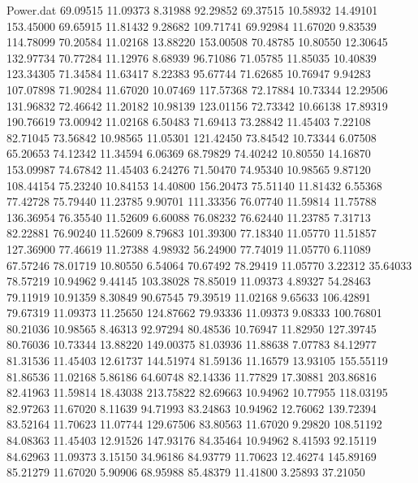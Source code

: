 \begin{filecontents}{Power.dat}
  69.09515   11.09373    8.31988   92.29852
  69.37515   10.58932   14.49101  153.45000
  69.65915   11.81432    9.28682  109.71741
  69.92984   11.67020    9.83539  114.78099
  70.20584   11.02168   13.88220  153.00508
  70.48785   10.80550   12.30645  132.97734
  70.77284   11.12976    8.68939   96.71086
  71.05785   11.85035   10.40839  123.34305
  71.34584   11.63417    8.22383   95.67744
  71.62685   10.76947    9.94283  107.07898
  71.90284   11.67020   10.07469  117.57368
  72.17884   10.73344   12.29506  131.96832
  72.46642   11.20182   10.98139  123.01156
  72.73342   10.66138   17.89319  190.76619
  73.00942   11.02168    6.50483   71.69413
  73.28842   11.45403    7.22108   82.71045
  73.56842   10.98565   11.05301  121.42450
  73.84542   10.73344    6.07508   65.20653
  74.12342   11.34594    6.06369   68.79829
  74.40242   10.80550   14.16870  153.09987
  74.67842   11.45403    6.24276   71.50470
  74.95340   10.98565    9.87120  108.44154
  75.23240   10.84153   14.40800  156.20473
  75.51140   11.81432    6.55368   77.42728
  75.79440   11.23785    9.90701  111.33356
  76.07740   11.59814   11.75788  136.36954
  76.35540   11.52609    6.60088   76.08232
  76.62440   11.23785    7.31713   82.22881
  76.90240   11.52609    8.79683  101.39300
  77.18340   11.05770   11.51857  127.36900
  77.46619   11.27388    4.98932   56.24900
  77.74019   11.05770    6.11089   67.57246
  78.01719   10.80550    6.54064   70.67492
  78.29419   11.05770    3.22312   35.64033
  78.57219   10.94962    9.44145  103.38028
  78.85019   11.09373    4.89327   54.28463
  79.11919   10.91359    8.30849   90.67545
  79.39519   11.02168    9.65633  106.42891
  79.67319   11.09373   11.25650  124.87662
  79.93336   11.09373    9.08333  100.76801
  80.21036   10.98565    8.46313   92.97294
  80.48536   10.76947   11.82950  127.39745
  80.76036   10.73344   13.88220  149.00375
  81.03936   11.88638    7.07783   84.12977
  81.31536   11.45403   12.61737  144.51974
  81.59136   11.16579   13.93105  155.55119
  81.86536   11.02168    5.86186   64.60748
  82.14336   11.77829   17.30881  203.86816
  82.41963   11.59814   18.43038  213.75822
  82.69663   10.94962   10.77955  118.03195
  82.97263   11.67020    8.11639   94.71993
  83.24863   10.94962   12.76062  139.72394
  83.52164   11.70623   11.07744  129.67506
  83.80563   11.67020    9.29820  108.51192
  84.08363   11.45403   12.91526  147.93176
  84.35464   10.94962    8.41593   92.15119
  84.62963   11.09373    3.15150   34.96186
  84.93779   11.70623   12.46274  145.89169
  85.21279   11.67020    5.90906   68.95988
  85.48379   11.41800    3.25893   37.21050

\end{filecontents}
